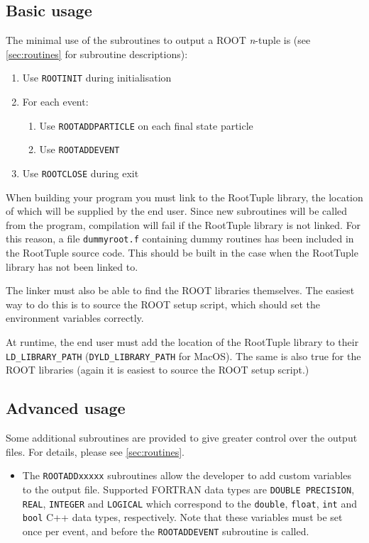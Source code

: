 \documentclass[a4paper,12pt]{article}
\begin{document}
\subsection{Basic usage}
The minimal use of the subroutines to output a ROOT \emph{n}-tuple is (see \textsection\ref{sec:routines} for subroutine descriptions):
\begin{enumerate}
    \item Use \verb|ROOTINIT| during initialisation
    \item For each event:
    \begin{enumerate}
        \item Use \verb|ROOTADDPARTICLE| on each final state particle
        \item Use \verb|ROOTADDEVENT|
    \end{enumerate}
    \item Use \verb|ROOTCLOSE| during exit
\end{enumerate}

When building your program you must link to the RootTuple library, the location of which will be supplied by the end user. Since new subroutines will be called from the program, compilation will fail if the RootTuple library is not linked. For this reason, a file \verb|dummyroot.f| containing dummy routines has been included in the RootTuple source code. This should be built in the case when the RootTuple library has not been linked to.

The linker must also be able to find the ROOT libraries themselves. The easiest way to do this is to source the ROOT setup script, which should set the environment variables correctly.

At runtime, the end user must add the location of the RootTuple library to their \verb|LD_LIBRARY_PATH| (\verb|DYLD_LIBRARY_PATH| for MacOS). The same is also true for the ROOT libraries (again it is easiest to source the ROOT setup script.)

\subsection{Advanced usage}
Some additional subroutines are provided to give greater control over the output files. For details, please see \textsection\ref{sec:routines}.
\begin{itemize}
    \item The \verb|ROOTADDxxxxx| subroutines allow the developer to add custom variables to the output file. Supported FORTRAN data types are \verb|DOUBLE PRECISION|, \verb|REAL|, \verb|INTEGER| and \verb|LOGICAL| which correspond to the \verb|double|, \verb|float|, \verb|int| and \verb|bool| C++ data types, respectively. Note that these variables must be set once per event, and before the \verb|ROOTADDEVENT| subroutine is called.
\end{itemize}
\end{document}
